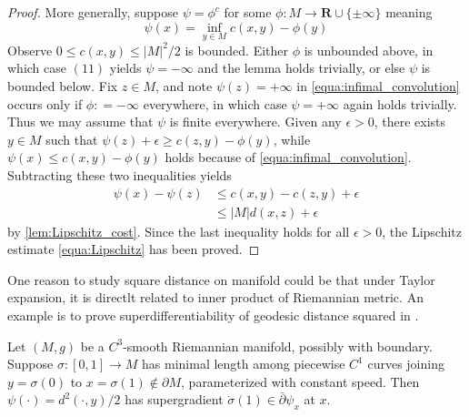\begin{proof}
	More generally, suppose \( \psi = \phi ^ { c } \) for some \( \phi : M \rightarrow \mathbf { R } \cup \{ \pm \infty \} \) meaning
	\begin{equation}
		\label{equa:infimal_convolution}
		\psi ( x ) = \inf _ { y \in M } c ( x , y ) - \phi ( y )
	\end{equation}
	Observe \( 0 \leq c ( x , y ) \leq | M | ^ { 2 } / 2 \) is bounded.
	Either \( \phi \) is unbounded above, in which case \( ( 11 ) \) yields \( \psi = - \infty \) and the lemma holds trivially, or else \( \psi \) is bounded below.
	Fix \( z \in M \), and note \( \psi ( z ) = + \infty \) in \cref{equa:infimal_convolution} occurs only if \( \phi : = - \infty \) everywhere, in which case \( \psi = + \infty \) again holds trivially.
	Thus we may assume that \( \psi \) is finite everywhere.
	Given any \( \epsilon > 0 \), there exists \( y \in M \)
	such that \( \psi ( z ) + \epsilon \geq c ( z , y ) - \phi ( y ) \), while \( \psi ( x ) \leq c ( x , y ) - \phi ( y ) \) holds because of \cref{equa:infimal_convolution}.
	Subtracting these two inequalities yields
	\begin{align*}
		\psi ( x ) - \psi ( z ) & \leq c ( x , y ) - c ( z , y ) + \epsilon \\
		                        & \leq | M | d ( x , z ) + \epsilon
	\end{align*}
	by \cref{lem:Lipschitz_cost}. Since the last inequality holds for all \( \epsilon > 0 \), the Lipschitz
	estimate \cref{equa:Lipschitz} has been proved.
\end{proof}

One reason to study square distance on manifold could be that under Taylor expansion, it is directlt related to inner product of Riemannian metric.
An example is to prove superdifferentiability of geodesic distance squared in \cite{mccann2001polar}.

\begin{prop}
	Let \( ( M , g ) \) be a \( C ^ { 3 } \)-smooth Riemannian manifold, possibly with boundary.
	Suppose \( \sigma : [ 0,1 ] \rightarrow M \) has minimal length among piecewise \( C ^ { 1 } \) curves joining \( y = \sigma ( 0 ) \) to \( x = \sigma ( 1 ) \notin \partial M \), parameterized with constant speed.
	Then \( \psi ( \cdot ) = d ^ { 2 } ( \cdot , y ) / 2 \) has supergradient \( \dot { \sigma } ( 1 ) \in \bar { \partial } \psi _ { x } \) at \( x \).
\end{prop}

